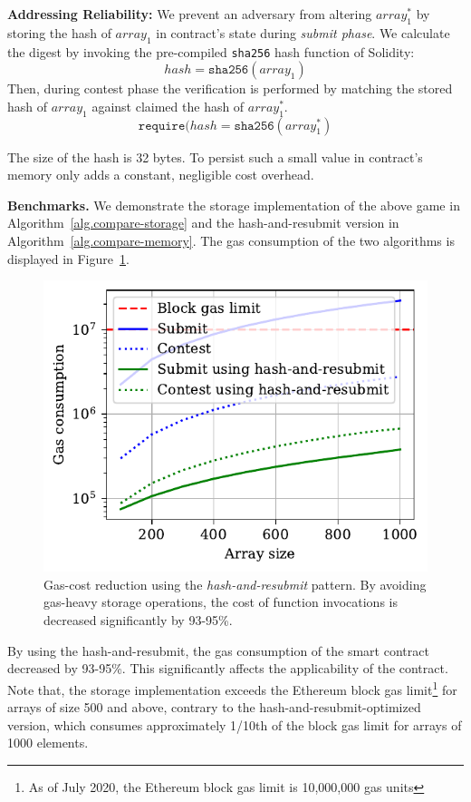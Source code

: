 \noindent
\textbf{Addressing Reliability:} We prevent an adversary from altering
$array_1^*$ by storing the hash of $array_1$ in contract's state during
\emph{submit phase}. We calculate the digest by invoking the pre-compiled
\texttt{sha256} hash function of Solidity:
\[hash = \texttt{sha256}(array_1)\]
Then, during contest phase the verification is performed
by matching the stored hash of $array_1$ against claimed the hash of
$array_1^*$. \[\texttt{require}(hash = \texttt{sha256}(array_1^*)\]

The size of the hash is 32 bytes. To persist such a small value in contract's
memory only adds a constant, negligible cost overhead.

\noindent \textbf{Benchmarks.} We demonstrate the storage implementation of the
above game in Algorithm~\ref{alg.compare-storage} and the hash-and-resubmit
version in Algorithm~\ref{alg.compare-memory}. The gas consumption of the two
algorithms is displayed in Figure~\ref{fig:har-example}.

\begin{figure}[h!]
\begin{center}
\includegraphics[width=1 \columnwidth]{figures/har-example.pdf}
\end{center}
\caption{Gas-cost reduction using the \emph{hash-and-resubmit} pattern. By
avoiding gas-heavy storage operations, the cost of function invocations is
decreased significantly by 93-95\%.}
\label{fig:har-example}
\end{figure}

By using the hash-and-resubmit, the gas consumption of the smart contract
decreased by 93-95\%. This significantly affects the applicability of the
contract. Note that, the storage implementation exceeds the Ethereum block gas
limit\footnote{As of July 2020, the Ethereum block gas limit is 10,000,000 gas
units} for arrays of size 500 and above, contrary to the
hash-and-resubmit-optimized version, which consumes approximately 1/10th of the
block gas limit for arrays of 1000 elements.

